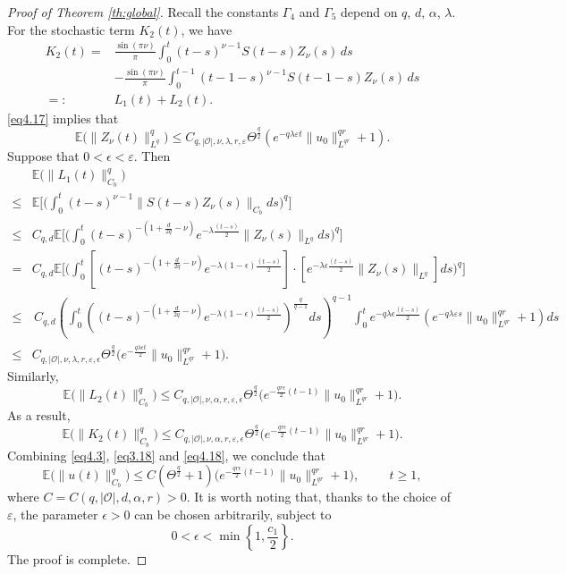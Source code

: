 \documentclass[10pt]{article}
\numberwithin{figure}{section}
\numberwithin{equation}{section}
\newcommand{\0}{{\theta}}
\def\be{\begin{equation}}
\def\ee{\end{equation}}
\def\lam{\lambda}
\def\ve{\varepsilon}
\def\a{\alpha}
\def\.{\cdot}
\def\E{\mathbb{E}}
\def\Hs{\hspace{1cm}}\def\hs{\hspace{0.5cm}}
\def\({\left(}\def\){\right)}
\begin{document}
\begin{proof}[Proof of Theorem \ref{th:global}]
Recall the constants $\Gamma_4$ and $\Gamma_5$ depend on $q$, $d$, $\alpha$, $\lambda$. For the stochastic term $K_2(t)$, 
we have$$\begin{aligned}
K_2(t)=&\frac{\sin(\pi\nu)}{\pi}\int_0^{t}(t-s)^{\nu-1}S(t-s)Z_\nu(s)\,ds\\
&-\frac{\sin(\pi\nu)}{\pi}\int_0^{t-1}(t-1-s)^{\nu-1}S(t-1-s)Z_\nu(s)\,ds\\
=:&L_1(t)+L_2(t).\end{aligned}
$$
\eqref{eq4.17} implies that $$\mathbb{E}\big(\|Z_\nu(t)\|_{L^q}^q\big)\le C_{q,|\mathcal O|,\nu,\lam,r,\ve}\Theta^\frac{q}{2}(e^{-q\lam\ve t}\|u_0\| _{L^{qr}}^{qr}+1).$$
Suppose that $0<\epsilon<\ve$. Then
\begin{equation*}
\begin{split}
&\mathbb{E}\big(\|L_1(t) \|_{C_b}^q\big)\\
 \le & \E\Big[\Big(\int_0^t(t-s)^{\nu-1}\|S(t-s)Z_\nu(s)\|_{C_b}ds\Big)^q\Big]\\
\le&C_{q,d}\E\Big[\Big(\int_0^{t}(t-s)^{-(1+\frac{d}{2q}-\nu)}e^{-\lam\frac{(t-s)}{2}}\|Z_\nu(s)\|_{L^q}ds\Big)^q\Big]\\
=&C_{q,d}\E\Big[\Big(\int_0^{t}[(t-s)^{-(1+\frac{d}{2q}-\nu)}e^{-\lam(1-\epsilon)\frac{(t-s)}{2}}]\.[e^{-\lam\epsilon\frac{(t-s)}{2}}\|Z_\nu(s)\|_{L^q}]ds\Big)^q\Big]\\
\le&\,C_{q,d}\(\int_0^{t}\((t-s)^{-(1+\frac{d}{2q}-\nu)}e^{-\lam(1-\epsilon)\frac{(t-s)}{2}}\)^\frac{q}{q-1}ds\)^{q-1}\int_0^te^{-q\lam\epsilon\frac{(t-s)}{2}}(e^{-q\lam\ve s}\|u_0\| _{L^{qr}}^{qr}+1)ds\\
\le& C_{q,|\mathcal O|,\nu,\lam,r,\ve,\epsilon}\Theta^\frac{q}{2}\big(e^{-\frac{q\lam\epsilon t}{2}}\| u_0 \|_{L^{qr}}^{qr} + 1 \big).
\end{split}
\end{equation*}
Similarly, $$\mathbb{E}\big(\|L_2(t) \|_{C_b}^q\big) \le C_{q,|\mathcal O|,\nu,\a,r,\ve,\epsilon}\Theta^\frac{q}{2}\big( e^{-\frac{ qr\epsilon}{2}(t-1)}\| u_0 \|_{L^{qr}}^{qr} + 1 \big).$$
As a result, 
\be\label{eq4.18}\mathbb{E}\big(\|K_2(t) \|_{C_b}^q\big) \le C_{q,|\mathcal O|,\nu,\a,r,\ve,\epsilon}\Theta^\frac{q}{2}\big( e^{-\frac{qr\epsilon}{2}(t-1)}\| u_0 \|_{L^{qr}}^{qr} + 1 \big).\ee 
\vs
Combining \eqref{eq4.3}, \eqref{eq3.18} and \eqref{eq4.18},  we conclude that
\be\label{eq4.4}
\mathbb{E}\big(\| u(t) \|_{C_b}^q\big)\le C (\Theta^\frac{q}{2}+1)\big( e^{-\frac{qr\epsilon}{2}(t-1)}\| u_0 \|_{L^{qr}}^{qr} + 1 \big), \Hs t \ge 1,
\ee
where $C = C(q,|\mathcal{O}|,d,\alpha,r)> 0$. It is worth noting that, thanks to the choice of $\ve$, the parameter $\epsilon>0$ can be chosen arbitrarily, subject to
$$
0<\epsilon<\min\left\{1,\frac{c_1}{2}\right\}.
$$
The proof is complete.
\end{proof}
\end{document}
